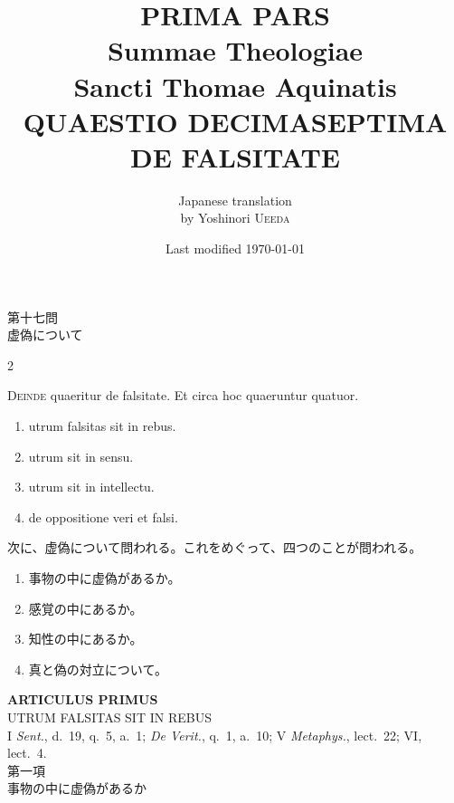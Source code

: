 \documentclass[paper=a4paper,fontsize=10pt,jafontsize=9pt,titlepage]{jlreq}
\title{{\bfseries PRIMA PARS}\\{\Huge Summae Theologiae}\\Sancti Thomae
Aquinatis\\{\sffamily QUAESTIO DECIMASEPTIMA}\\DE FALSITATE}
\author{Japanese translation\\by Yoshinori {\scshape Ueeda}}
\date{Last modified \today}
\begin{document}
\maketitle
\pagestyle{fancy}

\begin{center}
{\Large 第十七問\\虚偽について}
\end{center}

\begin{paracol}{2}

{\huge D}{\scshape einde} quaeritur de falsitate. Et circa hoc
 quaeruntur quatuor. 

\begin{enumerate}
 \item utrum falsitas sit in rebus.
 \item utrum sit in sensu.
 \item utrum sit in intellectu.
 \item de oppositione veri et falsi.
\end{enumerate}

\switchcolumn

次に、虚偽について問われる。これをめぐって、四つのことが問われる。
\begin{enumerate}
 \item 事物の中に虚偽があるか。
 \item 感覚の中にあるか。
 \item 知性の中にあるか。
 \item 真と偽の対立について。
\end{enumerate}

\end{paracol}

\newpage

{}
\setcounter{section}{1}
\setcounter{subsection}{0}
\begin{center}
 {\Large {\bfseries ARTICULUS PRIMUS}}\\
 {\large UTRUM FALSITAS SIT IN REBUS}\\
 {\footnotesize I {\itshape Sent.}, d.~19, q.~5, a.~1; {\itshape De
 Verit.}, q.~1, a.~10; V {\itshape Metaphys.}, lect.~22; VI, lect.~4.}\\
 {\Large 第一項\\事物の中に虚偽があるか}
\end{center}
\end{document}
